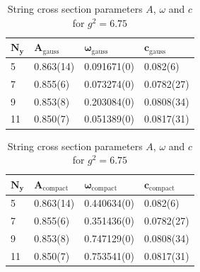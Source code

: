 \begin{table}[!hb]
\centering
\begin{tabular}{llll}
    $\mathbf{N_y}$ & $\mathbf{A_\mathrm{gauss}}$ & $\mathbf{\omega_\mathrm{gauss}}$ & $\mathbf{c_\mathrm{gauss}}$ \\ \hline
   5 & 0.863(14) & 0.091671(0) & 0.082(6) \\
   7 & 0.855(6) & 0.073274(0) & 0.0782(27) \\
   9 & 0.853(8) & 0.203084(0) & 0.0808(34) \\
   11 & 0.850(7) & 0.051389(0) & 0.0817(31) \\
\end{tabular}
\begin{tabular}{llll}
    $\mathbf{N_y}$ & $\mathbf{A_\mathrm{compact}}$ & $\mathbf{\omega_\mathrm{compact}}$ & $\mathbf{c_\mathrm{compact}}$ \\ \hline
   5 & 0.863(14) & 0.440634(0) & 0.082(6) \\
   7 & 0.855(6) & 0.351436(0) & 0.0782(27) \\
   9 & 0.853(8) & 0.747129(0) & 0.0808(34) \\
   11 & 0.850(7) & 0.753541(0) & 0.0817(31) \\
\end{tabular}
\caption{String cross section parameters $A$, $\omega$ and $c$ for $g^2=6.75$}
\end{table}
